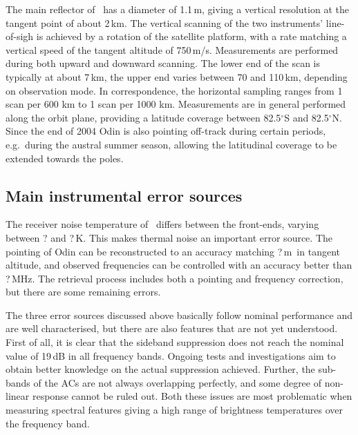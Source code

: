 The main reflector of \smr\ has a diameter of 1.1\,m, giving a
vertical resolution at the tangent point of about 2\,km. The vertical scanning
of the two instruments' line-of-sigh is achieved by a rotation of the satellite
platform, with a rate matching a vertical speed of the tangent altitude of
750\,m/s. Measurements are performed during both upward and downward scanning.
The lower end of the scan is typically at about 7\,km, the upper end varies
between 70 and 110\,km, depending on observation mode. In correspondence,
the horizontal sampling ranges from 1 scan per 600 km to 1 scan per 1000 km.
Measurements are in general performed along the orbit plane, providing a
latitude coverage between 82.5$^{\circ}$S and 82.5$^{\circ}$N. Since the end of
2004 Odin is also pointing off-track during certain periods, e.g.\ during the
austral summer season, allowing the latitudinal coverage to be extended towards
the poles. 


\subsection{Main instrumental error sources}
\label{sec:smr:errors}
%
The receiver noise temperature of \smr\ differs between the front-ends, varying
between ? and ?\,K. This makes thermal noise an important
error source. The pointing of Odin can be reconstructed to an accuracy matching
?\,m\ in tangent altitude, and observed frequencies can be
controlled with an accuracy better than ?\,MHz. The retrieval
process includes both a pointing and frequency correction, but there are some
remaining errors.

The three error sources discussed above basically follow nominal performance
and are well characterised, but there are also features that are not yet
understood. First of all, it is clear that the sideband suppression does not
reach the nominal value of 19\,dB in all frequency bands. Ongoing tests and
investigations aim to obtain better knowledge on the actual suppression achieved.
Further, the sub-bands of the ACs are not always overlapping perfectly, and
some degree of non-linear response cannot be ruled out. Both these issues are
most problematic when measuring spectral features giving a high range of
brightness temperatures over the frequency band.

